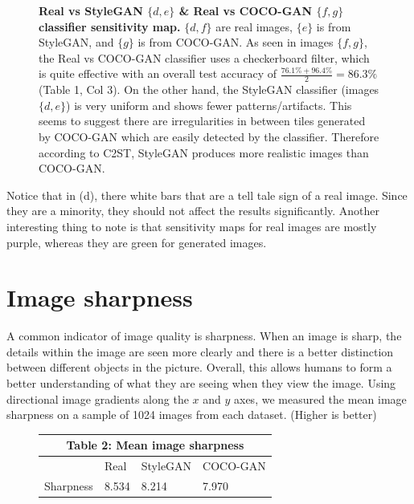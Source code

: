 \documentclass{article}
\begin{document}
\begin{figure}[H]
          \caption{\textbf{Real vs StyleGAN $\{d, e\}$ \& Real vs COCO-GAN $\{f, g\}$ classifier sensitivity map.} $\{d, f\}$ are real images, $\{e\}$ is from StyleGAN, and $\{g\}$ is from COCO-GAN. As seen in images $\{f, g\}$, the Real vs COCO-GAN classifier uses a checkerboard filter, which is quite effective with an overall test accuracy of $\frac{76.1\% + 96.4\%}{2} = 86.3\%$ (Table 1, Col 3). 
          On the other hand, the StyleGAN classifier (images $\{d, e\}$) is very uniform and shows fewer patterns/artifacts.
        This seems to suggest there are irregularities in between tiles generated by COCO-GAN which are easily detected by the classifier.
        Therefore according to C2ST, StyleGAN produces more realistic images than COCO-GAN.}
        \end{figure}
        
        Notice that in (d), there white bars that are a tell tale sign of a real image. Since they are a minority, they should not affect the results significantly.
        Another interesting thing to note is that sensitivity maps for real images are mostly purple, whereas they are green for generated images.
        
        \section{Image sharpness}
        \label{subsec:imageSharpness}
        A common indicator of image quality is sharpness.
        When an image is sharp, the details within the image are seen more clearly and there is a better distinction between different objects in the picture.
        Overall, this allows humans to form a better understanding of what they are seeing when they view the image.
        Using directional image gradients along the $x$ and $y$ axes, we measured the mean image sharpness on a sample of 1024 images from each dataset. (Higher is better)
        
        \begin{figure}[H]
            \centering
            \begin{tabular}{ |p{2cm}|p{2cm}|p{2cm}|p{2cm}|  }
                 \hline
                 \multicolumn{4}{|c|}{Table 2: Mean image sharpness} \\
                 \hline
                & Real & StyleGAN & COCO-GAN  \\
                \hline
                Sharpness & 8.534    & 8.214      & 7.970\\
                \hline
            \end{tabular}
        \end{figure}
        
\end{document}
